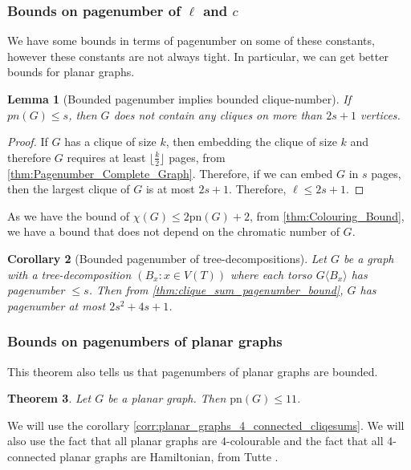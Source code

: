 \documentclass[]{report}
\newcommand{\pn}{\text{pn}}
\newtheorem{theorem}{Theorem}
\newtheorem{corollary}[theorem]{Corollary}
\newtheorem{lemma}[theorem]{Lemma}
\theoremstyle{definition}
\numberwithin{theorem}{section}
\numberwithin{equation}{section}
\begin{document}
\subsubsection{Bounds on pagenumber of $\ell$ and $c$}

We have some bounds in terms of pagenumber on some of these constants, however these constants are not always tight. In particular, we can get better bounds for planar graphs. 

\begin{lemma}[Bounded pagenumber implies bounded clique-number]
	If $pn(G) \leq s$, then $G$ does not contain any cliques on more than $2s+1$ vertices.
\end{lemma}

\begin{proof}
	If $G$ has a clique of size $k$, then embedding the clique of size $k$ and therefore $G$ requires at least $\lfloor \frac{k}{2} \rfloor$ pages, from \cref{thm:Pagenumber_Complete_Graph}. Therefore, if we can embed $G$ in $s$ pages, then the largest clique of $G$ is at most $2s + 1$. Therefore, $\ell \leq 2s + 1$. 
\end{proof}
As we have the bound of $\chi(G) \leq 2 \pn(G) + 2$, from \cref{thm:Colouring_Bound}, we have a bound that does not depend on the chromatic number of $G$. 
\begin{corollary}[Bounded pagenumber of tree-decompositions]
	Let $G$ be a graph with a tree-decomposition $(B_x: x \in V(T))$ where each torso $G \langle B_x \rangle$ has pagenumber $\leq s$. Then from \cref{thm:clique_sum_pagenumber_bound}, $G$ has pagenumber at most $2s^2 + 4s + 1$. 
\end{corollary}

\subsubsection{Bounds on pagenumbers of planar graphs}
This theorem also tells us that pagenumbers of planar graphs are bounded.

\begin{theorem}\label{thm:Planar Graph Hickingbotham Bound}
	Let $G$ be a planar graph. Then $\pn(G) \leq 11$.
\end{theorem}

We will use the corollary \cref{corr:planar_graphs_4_connected_cliqesums}. We will also use the fact that all planar graphs are $4$-colourable \cite{appelEveryPlanarMap1989} and the fact that all 4-connected planar graphs are Hamiltonian, from Tutte \cite{tutteTheoremPlanarGraphs1956}.
\end{document}
